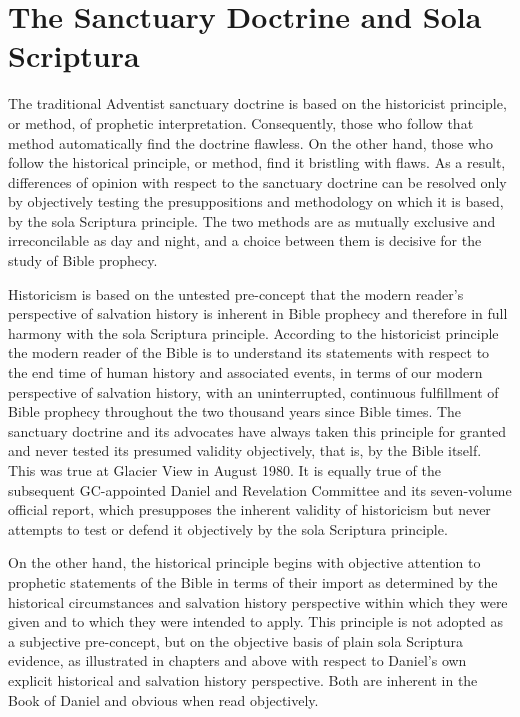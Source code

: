 \chapter{The Sanctuary Doctrine and Sola Scriptura}
\label{ch:sola}

The traditional Adventist sanctuary doctrine is based on the historicist
principle, or method, of prophetic interpretation. Consequently, those who
follow that method automatically find the doctrine flawless. On the other
hand, those who follow the historical principle, or method, find it
bristling with flaws. As a result, differences of opinion with respect to 
the sanctuary doctrine can be resolved only by objectively testing the
presuppositions and methodology on which it is based, by the sola Scriptura
principle. The two methods are as mutually exclusive and irreconcilable as
day and night, and a choice between them is decisive for the study of Bible
prophecy.

Historicism is based on the untested pre-concept that the modern reader's
perspective of salvation history is inherent in Bible prophecy and therefore
in full harmony with the sola Scriptura principle. According to the
historicist principle the modern reader of the Bible is to understand its
statements with respect to the end time of human history and associated
events, in terms of our modern perspective of salvation history, with an
uninterrupted, continuous fulfillment of Bible prophecy throughout the two
thousand years since Bible times. The sanctuary doctrine and its advocates
have always taken this principle for granted and never tested its presumed
validity objectively, that is, by the Bible itself. This was true at Glacier
View in August 1980. It is equally true of the subsequent GC-appointed
Daniel and Revelation Committee and its seven-volume official report, which
presupposes the inherent validity of historicism but never attempts to test
or defend it objectively by the sola Scriptura principle.

On the other hand, the historical principle begins with objective attention
to prophetic statements of the Bible in terms of their import as determined
by the historical circumstances and salvation history perspective within
which they were given and to which they were intended to apply. This
principle is not adopted as a subjective pre-concept, but on the objective
basis of plain sola Scriptura evidence, as illustrated in chapters 
 and 
above with respect to Daniel's own explicit historical and salvation history
perspective. Both are inherent in the Book of Daniel and obvious when read
objectively.

